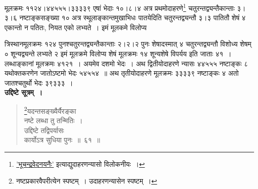 \documentclass[11pt, openany]{book}
\begin{document}
मूलक्रमः ११२४।४४५५५।३३३३९ एषां भेदाः १०।८।४ अत्र प्रथमोदाहरणे\renewcommand{\thefootnote}{*}\footnote{\hyperref[Ex 13.20]{'भूचन्द्रवेदनयनैः'} इत्याद्युदाहरणन्यासो विलोकनीयः~।} चतुरन्तद्व्यन्तैकान्ताः ३।३।६ नष्टाङ्कसङ्ख्या १० अत्र स्थूलाङ्कान्तमुखाभिधः पातयेदिति चतुरन्तद्व्यन्तौ ३।३ पातितौ शेषं ४ एकान्तो न पतितः, नियत एको लभ्यते~। इमं मूलकमे विलोप्य

\newpage

\noindent त्रिस्थानमूलक्रमः १२४ पुनश्चतुरन्तद्व्यन्तैकान्ताः २।२।२ पुनः शेषादस्मात् ४ चतुरन्तद्व्यन्तौ विशोध्य शेषम् ० शून्यद्व्यन्ते लभ्यते २ इमं मूलक्रमे विलोप्य शेषं मूलक्रमः १४ शून्यशेषे विपर्यय इति जाताः ४१~। लब्धाङ्कानां मूलक्रमः ४१२१~। अयमेव दशमो भेदः~। अथ द्वितीयोदाहरणे न्यासः ४४५५५ नष्टाङ्कः ८ यथोक्तकरणेन जातोऽष्टमो भेदः ५४५५४~॥ अथ तृतीयोदाहरणे मूलक्रमः ३३३३९ नष्टाङ्कः ४ अतो जातश्चतुर्थो भेदः ३९३३३~।\\

\textbf{उद्दिष्टे सूत्रम्~।}

\begin{quote}
\renewcommand{\thefootnote}{१}\footnote{नष्टप्रकारवैपरीत्येन स्पष्टम्~। उदाहरणन्यासेन स्पष्टम्~।}{\gk यदन्तसङ्ख्यैर्यैरङ्का\\
नष्टे लब्धा तु तन्मितिः~।\\
उद्दिष्टे तद्विपर्यासः\\
कार्योऽत्र सुधिया पुनः~॥~६१~॥}
\end{quote}
\end{document}
